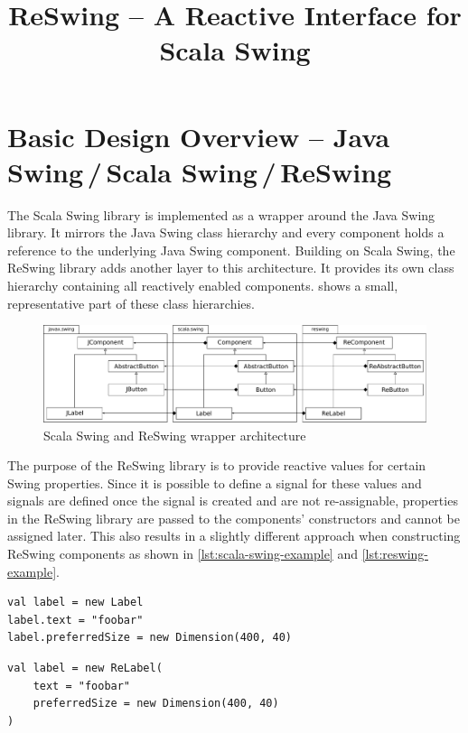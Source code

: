 \documentclass{scrartcl}
\title{ReSwing -- A Reactive Interface for Scala Swing}
\author{}
\date{}
\begin{document}
\maketitle
\section{Basic Design Overview -- Java Swing\,/\,Scala Swing\,/\,ReSwing}
\label{sec:overview}
The Scala Swing library is implemented as a wrapper around the Java Swing library. It mirrors the Java Swing class hierarchy and every component holds a reference to the underlying Java Swing component. Building on Scala Swing, the ReSwing library adds another layer to this architecture. It provides its own class hierarchy containing all reactively enabled components.  shows a small, representative part of these class hierarchies.

\begin{figure}[h]
  \centering
  \includegraphics[width=\textwidth]{overview}
  \caption{Scala Swing and ReSwing wrapper architecture}
  \label{fig:overview}
\end{figure}

The purpose of the ReSwing library is to provide reactive values for certain Swing properties. Since it is possible to define a signal for these values and signals are defined once the signal is created and are not re-assignable, properties in the ReSwing library are passed to the components' constructors and cannot be assigned later. This also results in a slightly different approach when constructing ReSwing components as shown in \cref{lst:scala-swing-example} and \cref{lst:reswing-example}.

\hspace{1em}\begin{lstlisting}[caption={Example for a Label component instantiation in Scala Swing},label={lst:scala-swing-example}]
val label = new Label
label.text = "foobar"
label.preferredSize = new Dimension(400, 40)
\end{lstlisting}

\begin{lstlisting}[caption={Example for a ReLabel component instantiation in ReSwing},label={lst:reswing-example}]
val label = new ReLabel(
    text = "foobar"
    preferredSize = new Dimension(400, 40)
)
\end{lstlisting}
\end{document}

